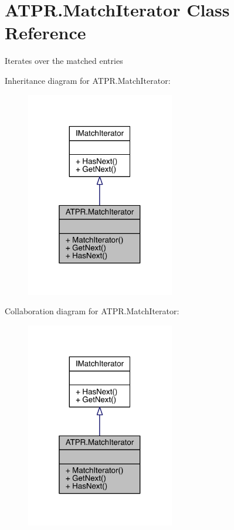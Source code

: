 \hypertarget{class_a_t_p_r_1_1_match_iterator}{}\section{A\+T\+P\+R.\+Match\+Iterator Class Reference}
\label{class_a_t_p_r_1_1_match_iterator}


Iterates over the matched entries  




Inheritance diagram for A\+T\+P\+R.\+Match\+Iterator\+:
\nopagebreak
\begin{figure}[H]
\begin{center}
\leavevmode
\includegraphics[width=184pt]{d2/d37/class_a_t_p_r_1_1_match_iterator__inherit__graph}
\end{center}
\end{figure}


Collaboration diagram for A\+T\+P\+R.\+Match\+Iterator\+:
\nopagebreak
\begin{figure}[H]
\begin{center}
\leavevmode
\includegraphics[width=184pt]{dd/dcf/class_a_t_p_r_1_1_match_iterator__coll__graph}
\end{center}
\end{figure}
